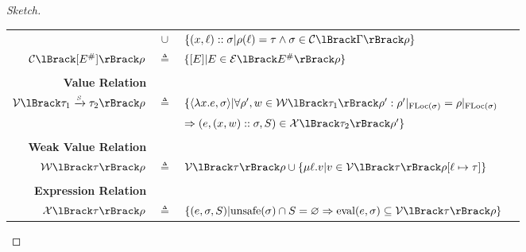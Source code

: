 \begin{proof}[Sketch]
\begin{tabular}{r@{\hskip2pt}c@{\hskip2pt}l@{\hskip1pt}r}
                                                   & $\cup$       & $\{(x,\ell)\cons\ctx|\rho(\ell)=\tau\land\ctx\in\CtxRel{\Gamma}\rho\}$                                                                                                              \\
    $\CtxRel{[\Abs\event]}\rho$                    & $\triangleq$ & $\{[\event]|\event\in\EvtRel{\Abs\event}\rho\}$                                                                                                                                     \\
    \\
    \textbf{Value Relation}                        &              &                                                                                                                                                & \fbox{$\ValRel{\tau}\rho$}         \\
    $\ValRel{\arrowty{\tau_1}{\Safe}{\tau_2}}\rho$ & $\triangleq$ & $\{\langle\lambda x.e,\ctx\rangle|\forall \rho',w\in\WalRel{\tau_1}\rho':\rho'|_{\FLoc(\ctx)}=\rho|_{\FLoc(\ctx)}$                                                                  \\
                                                   &              & \hphantom{$\{\langle\lambda x.e,\ctx\rangle|\vphantom\}$}$\Rightarrow(e,(x,w)\cons\ctx,S)\in\ExprRel{\tau_2}\rho'\}$                                      \\
    \\
    \textbf{Weak Value Relation}                   &              &                                                                                                                                                & \fbox{$\WalRel{\tau}\rho$}         \\
    $\WalRel{\tau}\rho$                            & $\triangleq$ & $\ValRel{\tau}\rho\cup\{\mu\ell.v|v\in\ValRel{\tau}\rho[\ell\mapsto\tau]\}$                                                                                                         \\
    \\
    \textbf{Expression Relation}                   &              &                                                                                                                                                & \fbox{$\ExprRel{\tau}\rho$}        \\
    $\ExprRel{\tau}\rho$                           & $\triangleq$ & $\{(e,\ctx,\Safe)|\unsafe(\ctx)\cap\Safe=\varnothing\Rightarrow\eval(e,\ctx)\subseteq\ValRel{\tau}\rho\}$                                                                           \\

\end{tabular}
\end{proof}
